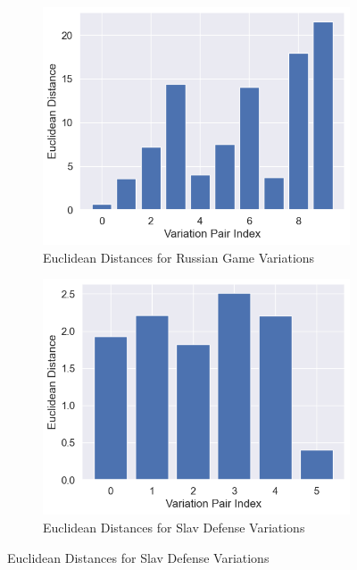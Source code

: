 \documentclass[a4paper, 11pt]{article}
\begin{document}
\begin{figure}[H]
    \centering
    \caption{Examples of Euclidean Distances for Opening Variations}
    \label{fig:euclideanDistancesForOpeningVariations}
    \begin{subfigure}{0.49\textwidth}
        \centering
        \caption{Euclidean Distances for Russian Game Variations}
        \includegraphics[width=\textwidth]{Euclidean Distances for Russian Game.png}
    \end{subfigure}
    \hfill
    \begin{subfigure}{0.49\textwidth}
        \centering
        \caption{Euclidean Distances for Slav Defense Variations}
        \includegraphics[width=\textwidth]{Euclidean Distances for Slav Defense.png}
    \end{subfigure}
\end{figure}
\end{document}
